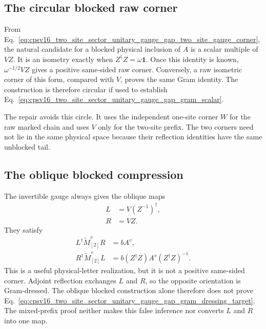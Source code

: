 \documentclass{article}
\begin{document}
\subsection{The circular blocked raw corner}

From
Eq.~\ref{eq:cpsv16_two_site_sector_unitary_gauge_gap_two_site_gauge_corner},
the natural candidate for a blocked physical inclusion of $A$ is a scalar
multiple of $VZ$. It is an isometry exactly when
$Z^\dagger Z=\omega\mathbf 1$. Once this identity is known,
$\omega^{-1/2}VZ$ gives a positive same-sided raw corner. Conversely, a raw
isometric corner of this form, compared with $V$, proves the same Gram
identity. The construction is therefore circular if used to establish
Eq.~\ref{eq:cpsv16_two_site_sector_unitary_gauge_gap_gram_scalar}.

The repair avoids this circle. It uses the independent one-site corner $W$
for the raw marked chain and uses $V$ only for the two-site prefix. The two
corners need not lie in the same physical space because their reflection
identities have the same unblocked tail.

\subsection{The oblique blocked compression}

The invertible gauge always gives the oblique maps
\begin{align}
    L
    &=V(Z^{-1})^\dagger,
    \label{eq:cpsv16_two_site_sector_unitary_gauge_gap_oblique_left_map}\\
    R
    &=VZ.
    \label{eq:cpsv16_two_site_sector_unitary_gauge_gap_oblique_right_map}
\end{align}
They satisfy
\begin{align}
    L^\dagger\widetilde M_{[2]}^vR
    &=bA^v,
    \label{eq:cpsv16_two_site_sector_unitary_gauge_gap_oblique_raw_compression}\\
    R^\dagger\widetilde M_{[2]}^vL
    &=b(Z^\dagger Z)A^v(Z^\dagger Z)^{-1}.
    \label{eq:cpsv16_two_site_sector_unitary_gauge_gap_oblique_gram_compression}
\end{align}
This is a useful physical-letter realization, but it is not a positive
same-sided corner. Adjoint reflection exchanges $L$ and $R$, so the opposite
orientation is Gram-dressed. The oblique blocked construction alone therefore
does not prove
Eq.~\ref{eq:cpsv16_two_site_sector_unitary_gauge_gap_gram_dressing_target}.
The mixed-prefix proof neither makes this false inference nor converts $L$
and $R$ into one map.
\end{document}
